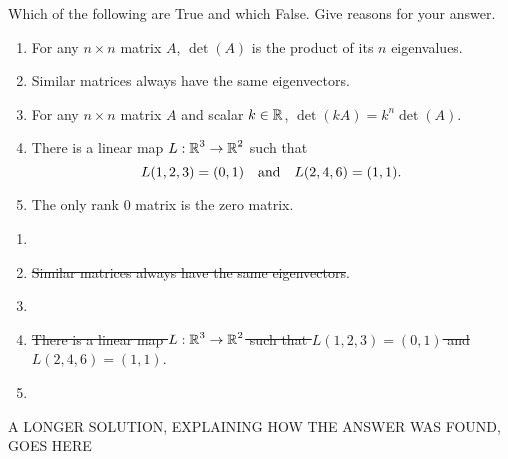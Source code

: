 \documentclass{ximera}
\author{Matt Carr}
\begin{document}
\begin{exercise}\label{mc8_1A}
\item
Which of the following are True and which False.  Give reasons for your answer.
\begin{enumerate}
\item For any $n \times n$ matrix $A$, $\det(A)$ is the product of its $n$ eigenvalues.
\item Similar matrices always have the same eigenvectors.
\item For any $n \times n$ matrix $A$ and scalar $k\in\mbox{$\Bbb{R}$}$, $\det(kA) = k^n \det(A)$.
\item There is a linear map $L: \mbox{$\Bbb{R}$}^3 \to \mbox{$\Bbb{R}$}^2$ such that 
\[
L(1,2,3) = (0,1) \quad\mbox{and}\quad L(2,4,6) = (1,1).
\]
\item The only rank $0$ matrix is the zero matrix.
\end{enumerate}

\begin{solution}

\ans 

\begin{enumerate}

\item {}
\item \sout{Similar matrices always have the same eigenvectors}.
\item {}
\item \sout{There is a linear map $L: \mbox{$\Bbb{R}$}^3 \to \mbox{$\Bbb{R}$}^2$ such that $L(1,2,3) = (0,1)$ and $L(2,4,6) = (1,1)$}.
\item {}
\end{enumerate}

\soln A LONGER SOLUTION, EXPLAINING HOW THE ANSWER WAS FOUND, GOES HERE 



  
\end{solution}
\end{exercise}
\end{document}

